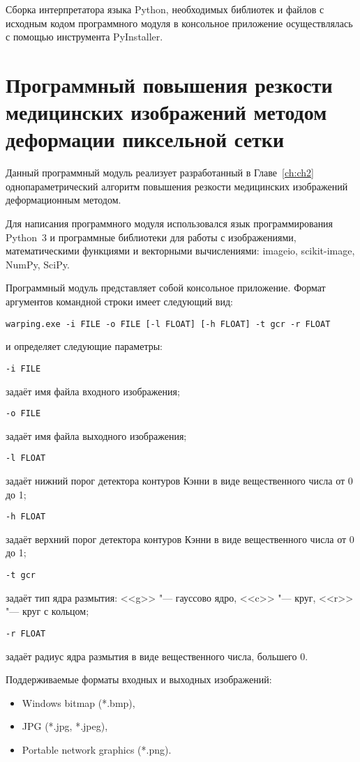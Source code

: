 Сборка интерпретатора языка Python, необходимых библиотек и файлов с исходным кодом программного модуля в консольное приложение осуществлялась с помощью инструмента PyInstaller.

\section{Программный повышения резкости медицинских изображений методом деформации пиксельной сетки}

Данный программный модуль реализует разработанный в Главе~\ref{ch:ch2} однопараметрический алгоритм повышения резкости медицинских изображений деформационным методом.

Для написания программного модуля использовался язык программирования Python~3 и программные библиотеки для работы с изображениями, математическими функциями и векторными вычислениями: imageio, scikit-image, NumPy, SciPy.

Программный модуль представляет собой консольное приложение. Формат аргументов командной строки имеет следующий вид:

\texttt{warping.exe -i~FILE -o~FILE [-l~FLOAT] [-h~FLOAT] -t~g\textbar c\textbar r -r~FLOAT}

\noindent и определяет следующие параметры:

\noindent \texttt{-i~FILE}

задаёт имя файла входного изображения;

\noindent \texttt{-o~FILE}

задаёт имя файла выходного изображения;

\noindent \texttt{-l~FLOAT}

задаёт нижний порог детектора контуров Кэнни в виде вещественного числа от 0 до 1;

\noindent \texttt{-h~FLOAT}

задаёт верхний порог детектора контуров Кэнни в виде вещественного числа от 0 до 1;

\noindent \texttt{-t~g\textbar c\textbar r}

задаёт тип ядра размытия: <<g>> "--- гауссово ядро, <<c>> "--- круг, <<r>> "--- круг с кольцом;

\noindent \texttt{-r~FLOAT}

задаёт радиус ядра размытия в виде вещественного числа, большего 0.

Поддерживаемые форматы входных и выходных изображений:

\begin{itemize}[beginpenalty=10000]
	\item Windows bitmap (*.bmp),
	\item JPG (*.jpg, *.jpeg),
	\item Portable network graphics (*.png).
\end{itemize}

